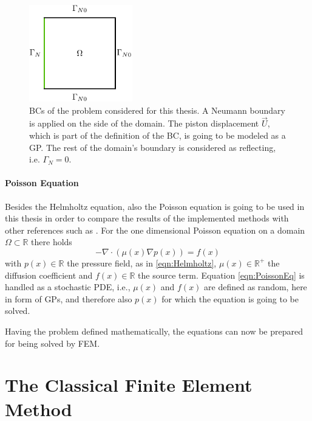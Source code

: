 \documentclass[%
  a4paper,oneside,%
  11pt,%
  smallchapters,
  style=printdev,
  extramargin,
  green,%
  rgb, <cmyk>
  ]{tubsbook}
\begin{document}
\begin{figure}[!ht]
\begin{center}
\includegraphics[width=0.4\textwidth]{pics/BCsThesis1}
\caption[BCs for the 2D Helmholtz equation example]{BCs of the problem considered for this thesis. A Neumann boundary is applied on the side of the domain. The piston displacement $\vec{U}$, which is part of the definition of the BC, is going to be modeled as a GP. The rest of the domain's boundary is considered as reflecting, i.e. $\Gamma_N = 0$.}
\label{fig:BCTh}
\end{center}
\end{figure}


\paragraph{Poisson Equation}
Besides the Helmholtz equation, also the Poisson equation is going to be used in this thesis in order to compare the results of the implemented methods with other references such as \cite{girolami2021}. For the one dimensional Poisson equation on a domain $\Omega \subset \mathbb{R} $ there holds
\begin{equation}
-\nabla \cdot (\mu(x) \nabla p(x)) = f(x)
\label{eqn:PoissonEq}
\end{equation}
with $p(x)\in \mathbb{R}$ the pressure field, as in \eqref{eqn:Helmholtz}, $\mu(x) \in \mathbb{R}^+$ the diffusion coefficient and $f(x) \in \mathbb{R}$ the source term.
Equation \eqref{eqn:PoissonEq} is handled as a stochastic PDE, i.e., $\mu(x)$ and $f(x)$ are defined as random, here in form of GPs, and therefore also $p(x)$ for which the equation is going to be solved. \cite[p. 4]{girolami2021}


Having the problem defined mathematically, the equations can now be prepared for being solved by FEM.




\section{The Classical Finite Element Method}
\end{document}
